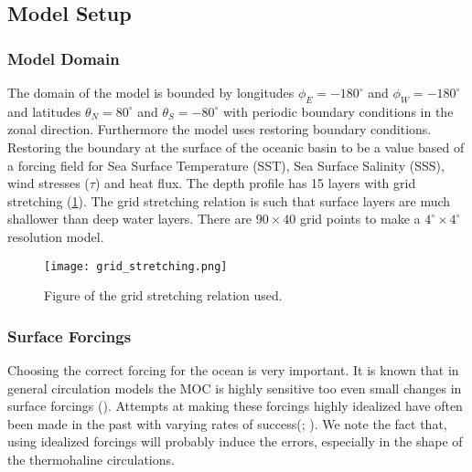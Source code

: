 
\subsection{Model Setup}
\subsubsection{Model Domain}
The domain of the model is bounded by longitudes $\phi_E=-180^{\circ}$ and $\phi_W=-180^{\circ}$ and latitudes $\theta_N=80^{\circ}$ and $\theta_S=-80^{\circ}$ with periodic boundary conditions in the zonal direction.
Furthermore the model uses restoring boundary conditions. Restoring the boundary at the surface of the oceanic basin to be a value based of a forcing field for Sea Surface Temperature (SST), Sea Surface Salinity (SSS), wind stresses ($\tau$) and heat flux.
 The depth profile has 15 layers with grid stretching (\cref{fig:gridstrech}). The grid stretching relation is such that surface layers are much shallower than deep water layers. There are $90 \times 40$ grid points to make a $4^{\circ} \times 4^{\circ}$ resolution model.
 
 \begin{figure}[H]
 	\texttt{[image: grid\_stretching.png]}
 	\caption{Figure of the grid stretching relation used.}
 	\label{fig:gridstrech}
 \end{figure}

\subsubsection{Surface Forcings}
 Choosing the correct forcing for the ocean is very important. It is known that in general circulation models the MOC is highly sensitive too even small changes in surface forcings (\cite{Milliff1999May}). Attempts at making these forcings highly idealized have often been made in the past with varying rates of success(\cite{bryan1987parameter}; \cite{Mulder2017Jul}). We note the fact that, using idealized forcings will probably induce the errors, especially in the shape of the thermohaline circulations.
 
